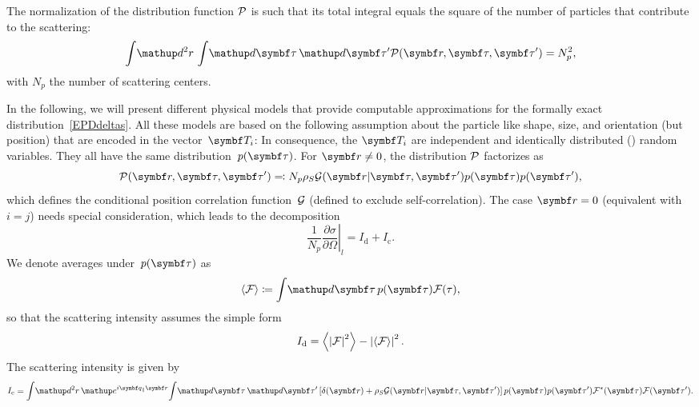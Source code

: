 The normalization of the distribution function $\mathcal{P}$ is such that its total
integral equals the square of the number of particles that contribute to the scattering:
\begin{equation}
  \int\!\d^2r\, \int\! \d\v{\tau}\, \d\v{\tau}' \PD(\r,\v\tau,\v\tau')
  = N_p^2,
\end{equation}
with $N_p$ the number of scattering centers.


In the following, we will present different physical models
that provide computable approximations
for the formally exact distribution~\cref{EPDdeltas}.
All these models are based on the following assumption
about the particle  like shape, size, and orientation
(but  position) that are  encoded in the vector~$\v T_i$:
%
In consequence, the $\v T_i$
are independent and identically distributed () random variables.
They all have the same distribution~$p(\v\tau)$.
For $\r\ne0$, the distribution $\mathcal{P}$ factorizes as
\begin{equation}
  \PD(\r,\v\tau,\v\tau')\eqqcolon N_p \rho_S \GD(\r|\v\tau,\v\tau')p(\v\tau)p(\v\tau'),
\end{equation}
which defines the conditional position correlation function~$\mathcal{G}$ (defined to exclude self-correlation).
The case $\r=0$ (equivalent with $i=j$) needs special consideration,
which leads to the decomposition
\Emph
{\begin{equation}
  \frac{1}{N_p}\left.\frac{\partial\sigma}{\partial\Omega}\right|_l
  = I_\text{d}+I_\text{c}.
\end{equation}\vskip -5pt}
We denote averages under~$p(\v\tau)$ as
\begin{equation}
  \bra\FD\ket \coloneqq  \int\!\d\v\tau\,p(\v\tau)\FD(\tau),
\end{equation}
so that the  scattering intensity assumes the simple form
%
%
\Emph
{\begin{equation}
  I_\text{d} = \left\langle\left|\mathcal{F}\right|^2\right\rangle-\left|\left\langle\mathcal{F}\right\rangle\right|^2.
\end{equation}\vskip -5pt}
The  scattering intensity is given by
\Emph
{\begin{equation}\label{EICoherent}
  I_\text{c} =
  \int\!\d^2r\,   \e^{i\q_{\plll}\r}\!
  \int\! \d\v{\tau}\, \d\v{\tau}'
  \left[\delta(\r)+\rho_S \GD(\r|\v\tau,\v\tau')\right]p(\v\tau)p(\v\tau')
    \FD^*(\v\tau) \FD(\v\tau').
\end{equation}\vskip -5pt}

